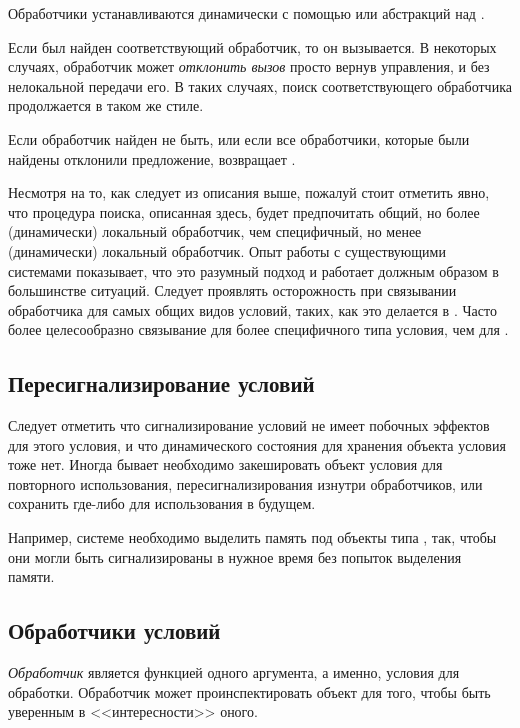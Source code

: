 Обработчики устанавливаются динамически с помощью  или
абстракций над .

Если был найден соответствующий обработчик, то он вызывается. В некоторых
случаях, обработчик может \emph{отклонить вызов} просто вернув управления, и без
нелокальной передачи его. В таких случаях, поиск соответствующего обработчика
продолжается в таком же стиле.

Если обработчик найден не быть, или если все обработчики, которые были найдены
отклонили предложение,  возвращает .


Несмотря на то, как следует из описания выше, пожалуй стоит отметить явно, что
процедура поиска, описанная здесь, будет предпочитать общий, но более
(динамически) локальный обработчик, чем специфичный, но менее (динамически)
локальный обработчик. Опыт работы с существующими системами показывает, что это
разумный подход и работает должным образом в большинстве ситуаций.  Следует
проявлять осторожность при связывании обработчика для самых общих видов условий,
таких, как это делается в . Часто более целесообразно
связывание для более специфичного типа условия, чем для .

\subsection{Пересигнализирование условий}

Следует отметить что сигнализирование условий не имеет побочных эффектов для
этого условия, и что динамического состояния для хранения объекта условия тоже
нет. Иногда бывает необходимо закешировать объект условия для повторного
использования, пересигнализирования изнутри обработчиков, или сохранить где-либо
 для использования в будущем.

Например, системе необходимо выделить память под объекты типа
, так, чтобы они могли быть сигнализированы в нужное
время без попыток выделения памяти.

\subsection{Обработчики условий}
\label{CONDITION-HANDLERS}

\emph{Обработчик} является функцией одного аргумента, а именно, условия для
обработки. Обработчик может проинспектировать объект для того, чтобы быть
уверенным в <<интересности>> оного.

